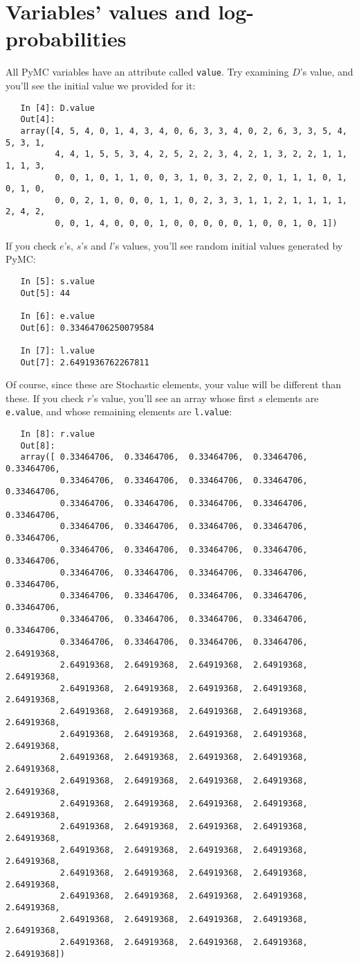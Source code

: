 \section*{Variables' values and log-probabilities}
All PyMC variables have an attribute called \texttt{value}. Try examining $D$'s value, and you'll see the initial value we provided for it:
\begin{verbatim}
   In [4]: D.value
   Out[4]: 
   array([4, 5, 4, 0, 1, 4, 3, 4, 0, 6, 3, 3, 4, 0, 2, 6, 3, 3, 5, 4, 5, 3, 1,
          4, 4, 1, 5, 5, 3, 4, 2, 5, 2, 2, 3, 4, 2, 1, 3, 2, 2, 1, 1, 1, 1, 3,
          0, 0, 1, 0, 1, 1, 0, 0, 3, 1, 0, 3, 2, 2, 0, 1, 1, 1, 0, 1, 0, 1, 0,
          0, 0, 2, 1, 0, 0, 0, 1, 1, 0, 2, 3, 3, 1, 1, 2, 1, 1, 1, 1, 2, 4, 2,
          0, 0, 1, 4, 0, 0, 0, 1, 0, 0, 0, 0, 0, 1, 0, 0, 1, 0, 1])
\end{verbatim}
If you check $e$'s, $s$'s and $l$'s values, you'll see random initial values generated by PyMC:
\begin{verbatim}
   In [5]: s.value
   Out[5]: 44

   In [6]: e.value
   Out[6]: 0.33464706250079584

   In [7]: l.value
   Out[7]: 2.6491936762267811
\end{verbatim}
Of course, since these are Stochastic elements, your value will be different than these. If you check $r$'s value, you'll see an array whose first $s$ elements are \texttt{e.value}, and whose remaining elements are \texttt{l.value}:
\begin{verbatim}
   In [8]: r.value
   Out[8]: 
   array([ 0.33464706,  0.33464706,  0.33464706,  0.33464706,  0.33464706,
           0.33464706,  0.33464706,  0.33464706,  0.33464706,  0.33464706,
           0.33464706,  0.33464706,  0.33464706,  0.33464706,  0.33464706,
           0.33464706,  0.33464706,  0.33464706,  0.33464706,  0.33464706,
           0.33464706,  0.33464706,  0.33464706,  0.33464706,  0.33464706,
           0.33464706,  0.33464706,  0.33464706,  0.33464706,  0.33464706,
           0.33464706,  0.33464706,  0.33464706,  0.33464706,  0.33464706,
           0.33464706,  0.33464706,  0.33464706,  0.33464706,  0.33464706,
           0.33464706,  0.33464706,  0.33464706,  0.33464706,  2.64919368,
           2.64919368,  2.64919368,  2.64919368,  2.64919368,  2.64919368,
           2.64919368,  2.64919368,  2.64919368,  2.64919368,  2.64919368,
           2.64919368,  2.64919368,  2.64919368,  2.64919368,  2.64919368,
           2.64919368,  2.64919368,  2.64919368,  2.64919368,  2.64919368,
           2.64919368,  2.64919368,  2.64919368,  2.64919368,  2.64919368,
           2.64919368,  2.64919368,  2.64919368,  2.64919368,  2.64919368,
           2.64919368,  2.64919368,  2.64919368,  2.64919368,  2.64919368,
           2.64919368,  2.64919368,  2.64919368,  2.64919368,  2.64919368,
           2.64919368,  2.64919368,  2.64919368,  2.64919368,  2.64919368,
           2.64919368,  2.64919368,  2.64919368,  2.64919368,  2.64919368,
           2.64919368,  2.64919368,  2.64919368,  2.64919368,  2.64919368,
           2.64919368,  2.64919368,  2.64919368,  2.64919368,  2.64919368,
           2.64919368,  2.64919368,  2.64919368,  2.64919368,  2.64919368])
\end{verbatim}
